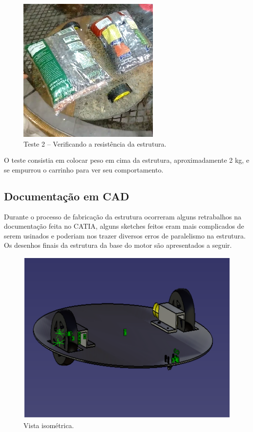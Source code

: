 \begin{figure}[H]
	\centering
	\includegraphics[scale=1]{figuras/base_teste_peso.png}
	\caption{Teste 2 – Verificando a resistência da estrutura.}
	\label{img:base_teste_peso}
\end{figure}

O teste consistia em colocar peso em cima da estrutura, aproximadamente 2 kg, e se empurrou o carrinho para ver seu comportamento.

\subsection{Documentação em CAD}

Durante o processo de fabricação da estrutura ocorreram alguns retrabalhos na documentação feita no CATIA, alguns sketches feitos eram mais complicados de serem usinados e poderiam nos trazer diversos erros de paralelismo na estrutura. Os desenhos finais da estrutura da base do motor são apresentados a seguir.

\begin{figure}[H]
	\centering
	\includegraphics[scale=0.5]{figuras/vista_isometrica.png}
	\caption{Vista isométrica.}
	\label{img:vista_isometrica}
\end{figure}


